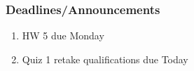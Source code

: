 
\begin{frame}
    \frametitle{Deadlines/Announcements}
\begin{enumerate}
            \item HW 5 due Monday
            \item Quiz 1 retake qualifications due Today 
        \end{enumerate}
\end{frame}
